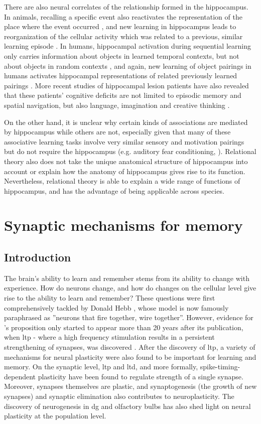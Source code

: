 There are also neural correlates of the relationship formed in the hippocampus. In animals, recalling a specific event also reactivates the representation of the place where the event occurred \citep{moita03, itskov11}, and new learning in hippocampus leads to reorganization of the cellular activity which was related to a previous, similar learning episode \citep{mckenzie13}. In humans, hippocampal activation during sequential learning only carries information about objects in learned temporal contexts, but not about objects in random contexts \citep{hsieh14}, and again, new learning of object pairings in humans activates hippocampal representations of related previously learned pairings \citep{zeithamova12}. More recent studies of hippocampal lesion patients have also revealed that these patients' cognitive deficits are not limited to episodic memory and spatial navigation, but also language, imagination and creative thinking \citep{duff09, duff13}.


On the other hand, it is unclear why certain kinds of associations are mediated by hippocampus while others are not, especially given that many of these associative learning tasks involve very similar sensory and motivation pairings but do not require the hippocampus (e.g. auditory fear conditioning, \citep{phillips92}). Relational theory also does not take the unique anatomical structure of hippocampus into account or explain how the anatomy of hippocampus gives rise to its function. Nevertheless, relational theory is able to explain a wide range of functions of hippocampus, and has the advantage of being applicable across species.


\section{Synaptic mechanisms for memory}
\subsection{Introduction}
The brain's ability to learn and remember stems from its ability to change with experience. How do neurons change, and how do changes on the cellular level give rise to the ability to learn and remember? These questions were first comprehensively tackled by Donald Hebb \citeyear{hebb49}, whose model is now famously paraphrased as ''neurons that fire together, wire together''. However, evidence for \citet{hebb49}'s proposition only started to appear more than 20 years after its publication, when \gls{ltp} - where a high frequency stimulation results in a persistent strengthening of synapses, was discovered \citep{bliss73}. After the discovery of \gls{ltp}, a variety of mechanisms for neural plasticity were also found to be important for learning and memory. On the synaptic level, \gls{ltp} and \gls{ltd}, and more formally, spike-timing-dependent plasticity have been found to regulate strength of a single synapse. Moreover, synapses themselves are plastic, and synaptogenesis (the growth of new synapses) and synaptic elimination also contributes to neuroplasticity. The discovery of neurogenesis in \gls{dg} and olfactory bulbs has also shed light on neural plasticity at the population level.

